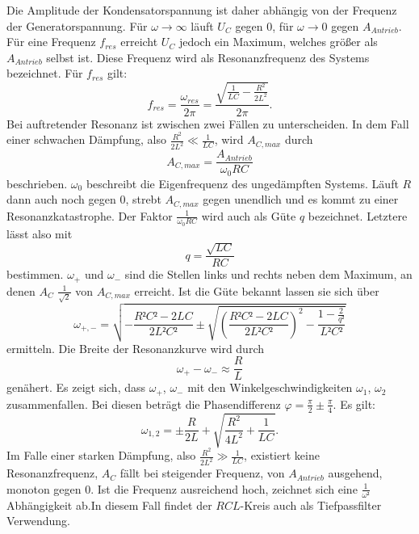 Die Amplitude der Kondensatorspannung ist daher abhängig von der Frequenz der Generatorspannung.
Für $\omega \to \infty$ läuft $U_C$ gegen 0, für $\omega \to 0$ gegen $A_{Antrieb}$.
Für eine Frequenz $f_{res}$ erreicht $U_C$  jedoch ein Maximum, welches größer als $A_{Antrieb}$ selbst ist.
Diese Frequenz wird als Resonanzfrequenz des Systems bezeichnet. Für $f_{res}$ gilt:
\begin{equation}
  f_{res} = \frac{\omega_{res}}{2\pi} = \frac{\sqrt{\frac{1}{LC}-\frac{R^2}{2L^2}}}{2 \pi}\text{.}
\end{equation}
Bei auftretender Resonanz ist zwischen zwei Fällen zu unterscheiden.
In dem Fall einer schwachen Dämpfung, also $\frac{R^2}{2L^2} \ll \frac{1}{LC}$, wird  $A_{C,max}$ durch
\begin{equation}
  A_{C,max} = \frac{A_{Antrieb}}{\omega_0 RC}
\end{equation}
beschrieben. $\omega_0$ beschreibt die Eigenfrequenz des ungedämpften Systems.
Läuft $R$ dann auch noch gegen 0, strebt $A_{C,max}$ gegen unendlich und es kommt zu einer
Resonanzkatastrophe.
 Der Faktor $\frac{1}{\omega_0 RC}$ wird auch als Güte $q$ bezeichnet.
Letztere lässt also mit
\begin{equation}
  q = \frac{\sqrt{LC}}{RC}
  \end{equation}
bestimmen. $\omega_+$ und $\omega_-$ sind die Stellen links und rechts neben dem Maximum,
 an denen $A_C$ $\frac{1}{\sqrt{2}}$ von $A_{C,max}$ erreicht.
 Ist die Güte bekannt lassen sie sich über
 \begin{equation}
   \omega_{+,-} = \sqrt{-\frac{R²C²-2LC}{2L²C²} \pm \sqrt{\left( \frac{R²C²-2LC}{2L²C²} \right) ^2 - \frac{1- \frac{2}{q²}}{L²C²}}}
 \end{equation}
 ermitteln.
 Die Breite der Resonanzkurve wird durch 
 \begin{equation}
   \omega_+ - \omega_- \approx \frac{R}{L}
 \end{equation}
 genähert. Es zeigt sich, dass $\omega_+$, $\omega_-$ mit den Winkelgeschwindigkeiten $\omega_1$, $\omega_2$ zusammenfallen.
  Bei diesen beträgt die Phasendifferenz $\varphi=\frac{\pi}{2} \pm \frac{\pi}{4}$. Es gilt:
\begin{equation}
  \omega_{1,2} = \pm \frac{R}{2L} + \sqrt{\frac{R^2}{4L^2} + \frac{1}{LC}}\text{.}
\end{equation}
 Im Falle einer starken Dämpfung, also $\frac{R^2}{2L^2} \gg \frac{1}{LC}$, existiert keine Resonanzfrequenz, $A_C$ fällt bei steigender Frequenz, von $A_{Antrieb}$ ausgehend, monoton gegen 0. Ist die Frequenz ausreichend hoch, zeichnet
  sich eine $\frac{1}{\omega²}$ Abhängigkeit ab.In diesem Fall findet der $RCL$-Kreis auch als Tiefpassfilter Verwendung.
